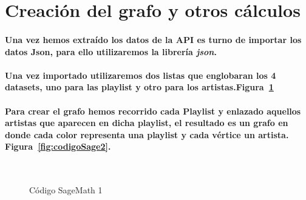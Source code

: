 \documentclass[11pt,spanish]{article}
\begin{document}
\pagebreak

\section{Creación del grafo y otros cálculos}

\paragraph*{Una vez hemos extraído los datos de la API es turno de importar los datos Json, para ello utilizaremos la librería \emph{json}.}

\paragraph*{Una vez importado utilizaremos dos listas que englobaran los 4 datasets, uno para las playlist y otro para los artistas.Figura~\ref{fig:codigoSage1}}

\paragraph*{Para crear el grafo hemos recorrido cada Playlist y enlazado aquellos artistas que aparecen en dicha playlist, 
el resultado es un grafo en donde cada color representa una playlist y cada vértice un artista. Figura~\ref{fig:codigoSage2}.}



\begin{figure}[H]
	\begin{center}
%
	   
	   \\ %
	  
%
	\end{center}
	\caption{%
	Código SageMath 1
 	}%
	\label{fig:codigoSage1}
\end{figure}
\end{document}
